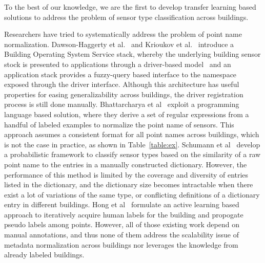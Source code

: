 To the best of our knowledge, we are the first to develop transfer learning based solutions to address the problem of sensor type classification across buildings.

Researchers have tried to systematically address the problem of point name normalization.
Dawson-Haggerty et al.~\cite{boss} and Krioukov et al.~\cite{bas}
introduce a Building Operating System Service stack, whereby
the underlying building sensor stock is presented to applications through a driver-based model \
and an application stack provides a fuzzy-query based interface to the namespace exposed
through the driver interface.
Although this architecture has useful properties for easing generalizability across
buildings, the driver registration process is still done manually.
Bhattarcharya et al~\cite{arka} exploit a programming language based solution,
where they derive a set of regular expressions from a handful of labeled examples
to normalize the point name of sensors.
This approach assumes a consistent format for all point names across buildings, which is not the case in practice, as shown in Table~\ref{table:ex}.
Schumann et al~\cite{ibm} develop a probabilistic framework to classify sensor types
based on the similarity of a raw point name to the entries in a manually constructed dictionary.
However, the performance of this method is limited by the coverage and diversity of entries listed in the dictionary, and the dictionary size becomes intractable when there exist a lot of variations of the same type, or conflicting definitions of a dictionary entry in different buildings.
Hong et al~\cite{cikm} formulate an active learning based approach to iteratively
acquire human labels for the building and propogate pseudo labels among points.
However, all of those existing work depend on manual annotations, and thus none of them address the scalability issue of metadata
normalization across buildings nor leverages the knowledge from already labeled buildings.

